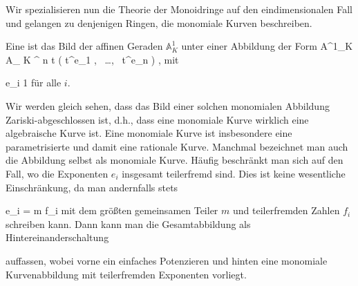 \setcounter{section}{18}







Wir spezialisieren nun die Theorie der Monoidringe auf den eindimensionalen Fall und gelangen zu denjenigen Ringen, die monomiale Kurven beschreiben.


{}
{





Eine  ist das Bild der affinen Geraden ${\mathbb A}^{1}_{K}$ unter einer Abbildung der Form
\maabbeledisp {} { {\mathbb A}^{1}_{K} } { { {\mathbb A}_{ K }^{ n  } }
} { t } { \left(  t^{e_1 }   , \,   \ldots  , \,   t^{e_n }                 \right)
} {,}
mit

\mavergleichskette
{\vergleichskette
{ e_i
}
{ \geq }{ 1
}
{  }{
}
{    }{
}
{   }{
}
}
{}{}{}
für alle $i$.





}

Wir werden gleich sehen, dass das Bild einer solchen monomialen Abbildung Zariski-abgeschlossen ist, d.h., dass eine monomiale Kurve wirklich eine algebraische Kurve ist. Eine monomiale Kurve ist insbesondere eine parametrisierte und damit eine
 {} {}
rationale Kurve.
Manchmal bezeichnet man auch die Abbildung selbst als monomiale Kurve. Häufig beschränkt man sich auf den Fall, wo die Exponenten $e_i$ insgesamt teilerfremd sind. Dies ist keine wesentliche Einschränkung, da man andernfalls stets

\mavergleichskette
{\vergleichskette
{ e_i
}
{ = }{ m f_i
}
{  }{
}
{    }{
}
{   }{
}
}
{}{}{}
mit dem größten gemeinsamen Teiler $m$ und teilerfremden Zahlen $f_i$ schreiben kann. Dann kann man die Gesamtabbildung als Hintereinanderschaltung

 {  }

auffassen, wobei vorne ein einfaches Potenzieren und hinten eine monomiale Kurvenabbildung mit teilerfremden Exponenten vorliegt.

